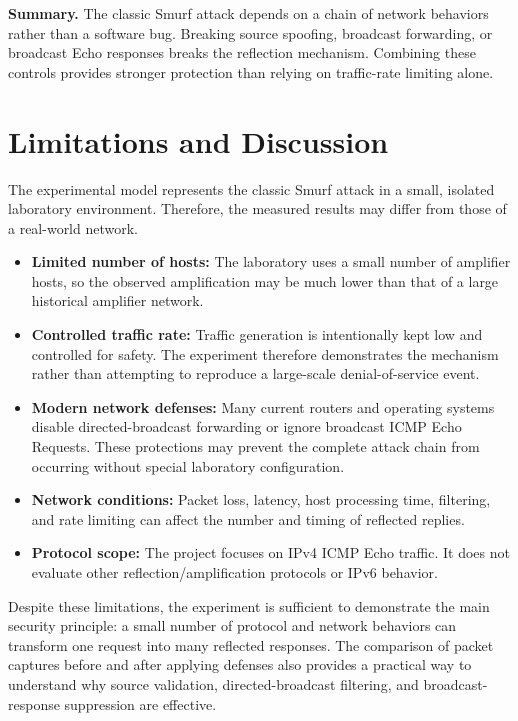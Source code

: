 \documentclass[12pt,a4paper]{article}
\begin{document}
\textbf{Summary.} The classic Smurf attack depends on a chain of network behaviors rather than a software bug. Breaking source spoofing, broadcast forwarding, or broadcast Echo responses breaks the reflection mechanism. Combining these controls provides stronger protection than relying on traffic-rate limiting alone.

\section{Limitations and Discussion}
The experimental model represents the classic Smurf attack in a small, isolated laboratory environment. Therefore, the measured results may differ from those of a real-world network.

\begin{itemize}
\item \textbf{Limited number of hosts:} The laboratory uses a small number of amplifier hosts, so the observed amplification may be much lower than that of a large historical amplifier network.
\item \textbf{Controlled traffic rate:} Traffic generation is intentionally kept low and controlled for safety. The experiment therefore demonstrates the mechanism rather than attempting to reproduce a large-scale denial-of-service event.
\item \textbf{Modern network defenses:} Many current routers and operating systems disable directed-broadcast forwarding or ignore broadcast ICMP Echo Requests. These protections may prevent the complete attack chain from occurring without special laboratory configuration.
\item \textbf{Network conditions:} Packet loss, latency, host processing time, filtering, and rate limiting can affect the number and timing of reflected replies.
\item \textbf{Protocol scope:} The project focuses on IPv4 ICMP Echo traffic. It does not evaluate other reflection/amplification protocols or IPv6 behavior.
\end{itemize}

Despite these limitations, the experiment is sufficient to demonstrate the main security principle: a small number of protocol and network behaviors can transform one request into many reflected responses. The comparison of packet captures before and after applying defenses also provides a practical way to understand why source validation, directed-broadcast filtering, and broadcast-response suppression are effective.
\end{document}
